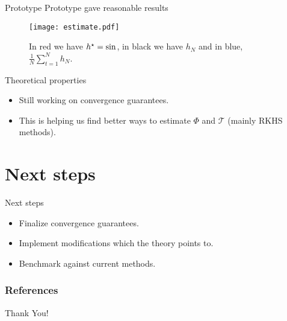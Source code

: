 \documentclass[aspectratio=169]{beamer}
\begin{document}
    \begin{frame}{Prototype}
        Prototype gave reasonable results
        \begin{figure}[htb]
            \begin{center}
                \texttt{[image: estimate.pdf]}
                \caption{In red we have $ h^{ \star } = \sin $, in black we have $ h_{ N } $ and in blue, $ \frac{ 1 }{ N } \sum_{ t=1 }^{ N } h_{ N } $.}
                \label{fig: prototype}
            \end{center}
        \end{figure}
    \end{frame}

    \begin{frame}{Theoretical properties}
        \begin{itemize}
            \item<1-> Still working on convergence guarantees.
            \item<2-> This is helping us find better ways to estimate $ \Phi $ and $ \mathcal{T} $ (mainly RKHS methods).
        \end{itemize}
    \end{frame}

    \section{Next steps}

    \begin{frame}{Next steps}
        \begin{itemize}
            \item<1-> Finalize convergence guarantees.
            \item<2-> Implement modifications which the theory points to.
            \item<3-> Benchmark against current methods.
        \end{itemize}
    \end{frame}

    \begin{frame}
        \frametitle{References}
        \nocite{*}
        \printbibliography
    \end{frame}

    \begin{frame}
        \centering Thank You!
    \end{frame}
\end{document}
